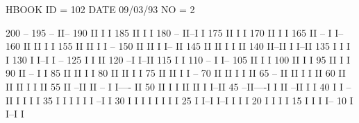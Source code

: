 \begin{Listing}
 HBOOK     ID =       102                                        DATE  09/03/93              NO =     2
 
      200                                                 --
      195                                             --  II--
      190                                             II  I  I
      185                                             II  I  I
      180                                     --      II--I  I
      175                                     II      I      I
      170                                     II      I      I
      165                                     II  --  I      I--
      160                                     II  II  I        I
      155                                     II  II  I        I    --
      150                                     II  II  I        I--  II
      145                                     II  II  I          I  II
      140                                     II--II  I          I--II
      135                                     I    I  I              I
      130                                     I    I--I              I  --
      125                                     I                      I  II
      120                                   --I                      I--II
      115                                   I                            I
      110                 --                I                            I--
      105                 II                I                              I
      100                 II                I                              I
       95                 II                I                              I
       90                 II    --          I                              I
       85                 II    II          I                              I
       80                 II    II          I                              I
       75                 II    II          I                              I      --
       70                 II    II          I                              I      II
       65         --      II    II          I                              I      II
       60         II      II    II          I                              I      II
       55         II    --II    II    --    I                              I----  II
       50         II    I  I    II    II    I                                  I--II
       45       --II----I  I    II  --II    I                                      I
       40       I          I  --II  I  I    I                                      I
       35       I          I  I  I  I  I  --I                                      I
       30       I          I  I  I  I  I  I                                        I
       25       I          I--I  I--I  I  I                                        I
       20       I                      I  I                                        I
       15       I                      I  I                                        I--
       10       I                      I--I                                          I
 

\end{Listing}
